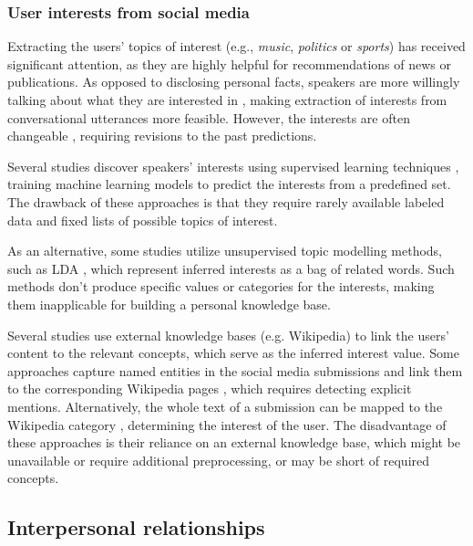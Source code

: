 
\subsubsection{User interests from social media}

Extracting the users' topics of interest (e.g., \textit{music}, \textit{politics} or \textit{sports}) has received significant attention, as they are highly helpful for recommendations of news or publications. As opposed to disclosing personal facts, speakers are more willingly talking about what they are interested in \cite{seghouani2019determining, raghuram2016efficient}, making extraction of interests from conversational utterances more feasible. However, the interests are often changeable \cite{piao2018inferring}, requiring revisions to the past predictions.

Several studies discover speakers' interests using supervised learning techniques \cite{raghuram2016efficient}, training machine learning models to predict the interests from a predefined set. The drawback of these approaches is that they require rarely available labeled data and fixed lists of possible topics of interest.

As an alternative, some studies utilize unsupervised topic modelling methods, such as LDA \cite{weng2010twitterrank}, which represent inferred interests as a bag of related words. Such methods don't produce specific values or categories for the interests, making them inapplicable for building a personal knowledge base.

Several studies use external knowledge bases (e.g. Wikipedia) to link the users' content to the relevant concepts, which serve as the inferred interest value. Some approaches capture named entities in the social media submissions and link them to the corresponding Wikipedia pages \cite{kapanipathi2014user, michelson2010discovering}, which requires detecting explicit mentions. Alternatively, the whole text of a submission can be mapped to the Wikipedia category \cite{seghouani2019determining}, determining the interest of the user. The disadvantage of these approaches is their reliance on an external knowledge base, which might be unavailable or require additional preprocessing, or may be short of required concepts.

\subsection{Interpersonal relationships}

